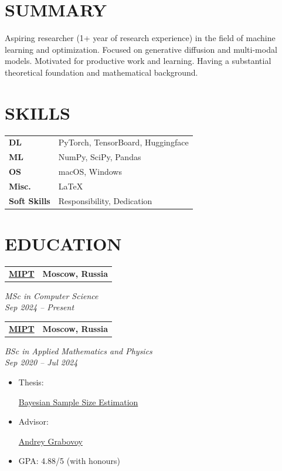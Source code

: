 \documentclass[11pt,a4paper]{moderncv}
\newcommand*{\educationentry}[4][0.5mm]{
    \begin{tabularx}{\textwidth}{LR}
        {\bfseries #3} & {\bfseries #4} \\
    \end{tabularx}
    {\itshape #2}
    \par\addvspace{#1}
}
\newcommand*{\scoreentry}[3][2.5mm]{
    {\bfseries #2} \\
    {\itshape #3}
    \par\addvspace{#1}
}
\begin{document}
\hfill
\begin{minipage}[t]{0.35\textwidth}

\section{SUMMARY}
Aspiring researcher (1+ year of research experience) in the field of machine learning and optimization. Focused on generative diffusion and multi-modal models. Motivated for productive work and learning. Having a substantial theoretical foundation and mathematical background.

\section{SKILLS}
\begin{tabularx}{\textwidth}{>{\bfseries}l@{\hskip 3.5mm}L}
DL & PyTorch, TensorBoard, Huggingface \\
ML & NumPy, SciPy, Pandas \\
OS & macOS, Windows \\
Misc. & \LaTeX \\
Soft Skills & Responsibility, Dedication
\end{tabularx}

\section{EDUCATION}

\educationentry{MSc in Computer Science\\Sep 2024 -- Present}{\href{https://mipt.ru}{MIPT}}{Moscow, Russia}

\educationentry{BSc in Applied Mathematics and Physics\\Sep 2020 -- Jul 2024}{\href{https://mipt.ru}{MIPT}}{Moscow, Russia}
\begin{itemize}
\item Thesis: \par \href{https://github.com/intsystems/Kiselev-BS-Thesis}{Bayesian Sample Size Estimation}
\item Advisor: \par \href{https://andriygav.github.io}{Andrey Grabovoy}
\item GPA: 4.88/5 (with honours)
\end{itemize}



\end{minipage}
\end{document}
